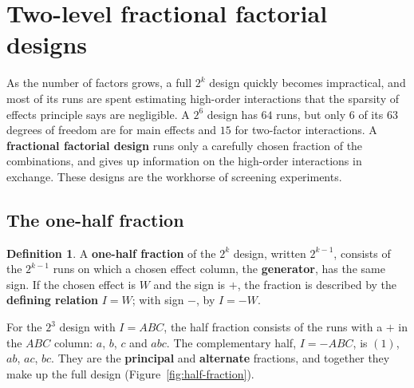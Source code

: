 \documentclass[11pt,a4paper]{article}
\numberwithin{equation}{section}
\theoremstyle{definition}
\newtheorem{defn}[thm]{Definition}
\begin{document}
\section{Two-level fractional factorial designs}
As the number of factors grows, a full $2^k$ design quickly becomes impractical, and most of its runs are spent estimating high-order
interactions that the sparsity of effects principle says are negligible. A $2^6$ design has $64$ runs, but only $6$ of its $63$ degrees of freedom are for
main effects and $15$ for two-factor interactions. A \textbf{fractional factorial design} runs only a carefully chosen fraction of the combinations,
and gives up information on the high-order interactions in exchange. These designs are the workhorse of screening experiments.

\subsection{The one-half fraction}
\begin{defn}
A \textbf{one-half fraction} of the $2^k$ design, written $2^{k-1}$, consists of the $2^{k-1}$ runs on which a chosen effect column, the \textbf{generator}, has the same
sign. If the chosen effect is $W$ and the sign is $+$, the fraction is described by the \textbf{defining relation} $I = W$; with sign $-$, by $I = -W$.
\end{defn}

For the $2^3$ design with $I = ABC$, the half fraction consists of the runs with a $+$ in the $ABC$ column: $a$, $b$, $c$ and $abc$. The complementary
half, $I = -ABC$, is $(1)$, $ab$, $ac$, $bc$. They are the \textbf{principal} and \textbf{alternate} fractions, and together they make up the full design
(Figure~\ref{fig:half-fraction}).
\end{document}
